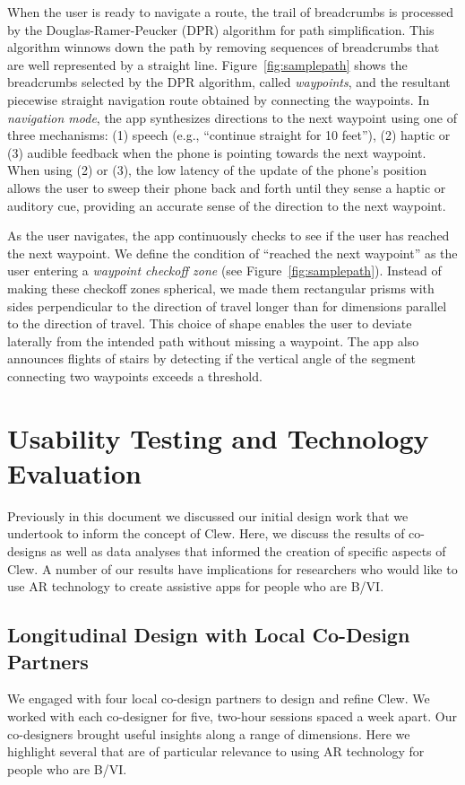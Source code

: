 \documentclass[chi_draft]{sigchi}
\newcommand{\BVI}{B/VI\xspace}
\begin{document}
When the user is ready to navigate a route, the trail of breadcrumbs is processed by the Douglas-Ramer-Peucker (DPR) algorithm \cite{douglas1973algorithms} for path simplification.  This algorithm winnows down the path by removing sequences of breadcrumbs that are well represented by a straight line.  Figure~\ref{fig:samplepath} shows the breadcrumbs selected by the DPR algorithm, called \emph{waypoints}, and the resultant piecewise straight navigation route obtained by connecting the waypoints.  In \emph{navigation mode}, the app synthesizes directions to the next waypoint using one of three mechanisms: (1) speech (e.g., ``continue straight for 10 feet''), (2) haptic or (3) audible feedback when the phone is pointing towards the next waypoint.  When using (2) or (3), the low latency of the update of the phone's position allows the user to sweep their phone back and forth until they sense a haptic or auditory cue, providing an accurate sense of the direction to the next waypoint.

As the user navigates, the app continuously checks to see if the user has reached the next waypoint.  We define the condition of ``reached the next waypoint'' as the user entering a \emph{waypoint checkoff zone} (see Figure~\ref{fig:samplepath}).  Instead of making these checkoff zones spherical, we made them rectangular prisms with sides perpendicular to the direction of travel longer than for dimensions parallel to the direction of travel.  This choice of shape enables the user to deviate laterally from the intended path without missing a waypoint.  The app also announces flights of stairs by detecting if the vertical angle of the segment connecting two waypoints exceeds a threshold.

\section{Usability Testing and Technology Evaluation}\label{sec:usabilityandevaluation}
Previously in this document we discussed our initial design work that we undertook to inform the concept of Clew.  Here, we discuss the results of co-designs as well as data analyses that informed the creation of specific aspects of Clew.  A number of our results have implications for researchers who would like to use AR technology to create assistive apps for people who are \BVI.

\subsection{Longitudinal Design with Local Co-Design Partners}
We engaged with four local co-design partners to design and refine Clew.  We worked with each co-designer for five, two-hour sessions spaced a week apart.  Our co-designers brought useful insights along a range of dimensions.  Here we highlight several that are of particular relevance to using AR technology for people who are \BVI.
\end{document}
